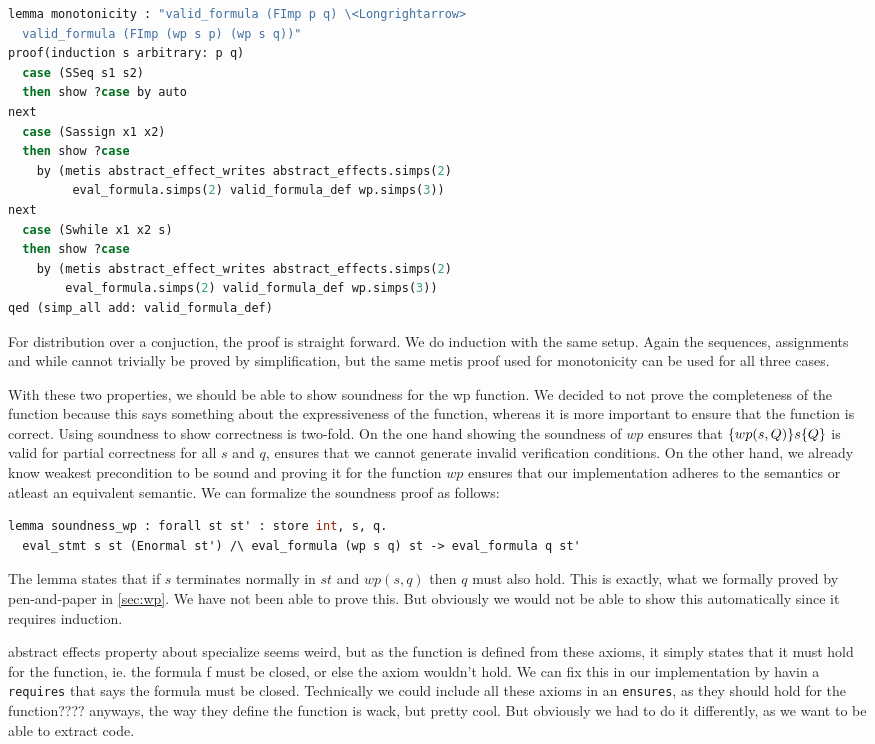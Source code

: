 \begin{lstlisting}[caption={Proof of monotonicity in Isabelle},label={lst:isamono},language=sml]
lemma monotonicity : "valid_formula (FImp p q) \<Longrightarrow>
  valid_formula (FImp (wp s p) (wp s q))"
proof(induction s arbitrary: p q)
  case (SSeq s1 s2)
  then show ?case by auto
next
  case (Sassign x1 x2)
  then show ?case
    by (metis abstract_effect_writes abstract_effects.simps(2)
         eval_formula.simps(2) valid_formula_def wp.simps(3))
next
  case (Swhile x1 x2 s)
  then show ?case
    by (metis abstract_effect_writes abstract_effects.simps(2)
        eval_formula.simps(2) valid_formula_def wp.simps(3))
qed (simp_all add: valid_formula_def)
\end{lstlisting}

For distribution over a conjuction, the proof is straight forward.
We do induction with the same setup.
Again the sequences, assignments and while cannot trivially be proved by simplification,
but the same metis proof used for monotonicity can be used for all three cases.

With these two properties, we should be able to show soundness for the wp function.
We decided to not prove the completeness of the function because this says something about the expressiveness of the function, whereas it is more important to ensure that
the function is correct.
Using soundness to show correctness is two-fold.
On the one hand showing the soundness of $wp$ ensures that $\{wp(s,Q)\}s\{Q\}$ is valid for partial correctness for all $s$ and $q$, ensures that we cannot generate invalid verification conditions.
On the other hand, we already know weakest precondition to be sound and proving it for the function $wp$ ensures that our implementation adheres to the semantics or atleast an equivalent semantic.
We can formalize the soundness proof as follows:

\begin{lstlisting}[caption={Proof of monotonicity in Isabelle},label={lst:isamono},language=sml]
  lemma soundness_wp : forall st st' : store int, s, q.
  eval_stmt s st (Enormal st') /\ eval_formula (wp s q) st -> eval_formula q st'
\end{lstlisting}

The lemma states that if $s$ terminates normally in $st$ and $wp(s,q)$ then $q$ must also hold.
This is exactly, what we formally proved by pen-and-paper in \ref{sec:wp}.
We have not been able to prove this. But obviously we would not be able to show this automatically since it requires induction.

abstract effects property about specialize seems weird, but as the function is defined
from these axioms, it simply states that it must hold for the function, ie. the formula f
must be closed, or else the axiom wouldn't hold.
We can fix this in our implementation by havin a \texttt{requires} that says the formula
must be closed.
Technically we could include all these axioms in an \texttt{ensures}, as they should hold
for the function???? anyways, the way they define the function is wack, but pretty cool.
But obviously we had to do it differently, as we want to be able to extract code.
